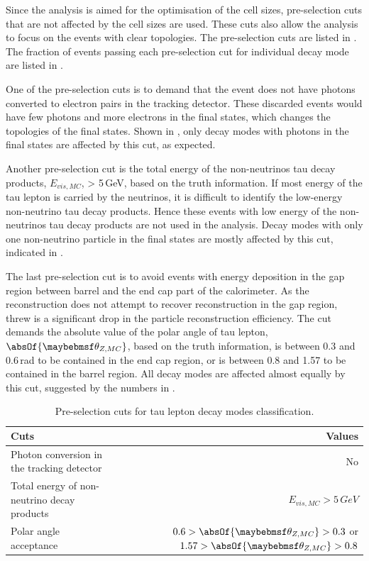 Since the analysis is aimed for the optimisation of the \ECAL cell sizes, pre-selection cuts that are not affected by the \ECAL cell sizes are used. These cuts also allow the analysis to focus on the events with clear topologies. The pre-selection cuts are listed in . The fraction of events passing each pre-selection cut for individual decay mode are listed in .

One of the pre-selection cuts is to demand that the event does not have photons converted to electron pairs in the tracking detector. These discarded events would have few photons and more electrons in the final states, which changes the topologies of the final states. Shown in , only decay modes with photons in the final states are affected by this cut, as expected.


Another pre-selection cut is the total energy of the non-neutrinos tau decay products, $E_{vis,MC}$, > 5\,GeV, based on the truth information. If most energy of the tau lepton is carried by the neutrinos, it is difficult to identify the low-energy non-neutrino tau decay products. Hence these events with low energy of the non-neutrinos tau decay products are not used in the analysis. Decay modes with only one non-neutrino particle in the final states are mostly affected by this cut, indicated in .

The last pre-selection cut is to avoid events with energy deposition in the gap region between barrel and the end cap part of the calorimeter. As the reconstruction   does not attempt to recover reconstruction in the gap region, threw is a significant drop in the particle reconstruction efficiency. The cut demands the absolute value of the polar angle of tau lepton,  $\absOf{\theta_{Z,MC}}$, based on the truth information, is between 0.3 and 0.6\,rad to be contained in the end cap region, or is between 0.8 and 1.57 to be contained in the barrel region. All decay modes are affected almost equally by this cut, suggested by the numbers in .


\begin{table}[htbp]\centering
\smallskip
\begin{tabular}{l r}
\hline
\hline
Cuts & Values\\
\hline
\multicolumn{1}{L{0.4\textwidth}}{Photon conversion in the tracking detector}& No \\
\multicolumn{1}{L{0.4\textwidth}}{Total energy of non-neutrino decay products} & $E_{vis,MC} > 5\,GeV$ \\
Polar angle acceptance & \multicolumn{1}{R{0.5\textwidth}}{$0.6 > \absOf{\theta_{Z,MC}} > 0.3$ or $1.57 > \absOf{\theta_{Z,MC}} > 0.8$} \\
\hline
\hline
\end{tabular}
\caption[Pre-selection cuts for tau lepton decay final state classification.]
{Pre-selection cuts for tau lepton decay modes classification.}
\label{tab:tauPreSel}
\end{table}


